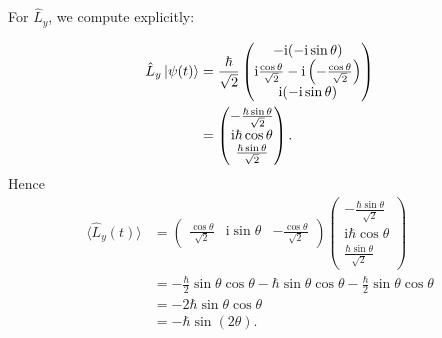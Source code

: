 \documentclass[11pt,a4paper]{scrartcl}
\newcommand{\ii}{\mathrm{i}}
\newcommand{\op}[1]{\hat{#1}}
\begin{document}
\begin{enumerate}[label=(\alph*)]
\begin{calculationbox}
            For $\op{L}_y$, we compute explicitly:
            \begin{calculationbox}
                \begin{align*}
                    \op{L}_y\ket{\psi(t)}
                    &=\frac{\hbar}{\sqrt{2}}
                    \begin{pmatrix}
                        -\ii(-\ii\sin\theta)\\
                        \ii\frac{\cos\theta}{\sqrt{2}}-\ii\left(-\frac{\cos\theta}{\sqrt{2}}\right)\\
                        \ii(-\ii\sin\theta)
                    \end{pmatrix} \\
                    &=
                    \begin{pmatrix}
                        -\frac{\hbar\sin\theta}{\sqrt{2}}\\
                        \ii\hbar\cos\theta\\
                        \frac{\hbar\sin\theta}{\sqrt{2}}
                    \end{pmatrix}.
                \end{align*}
                Hence
                \begin{align*}
                    \langle\op{L}_y(t)\rangle
                    &=
                    \begin{pmatrix}
                        \frac{\cos\theta}{\sqrt{2}} & \ii\sin\theta & -\frac{\cos\theta}{\sqrt{2}}
                    \end{pmatrix}
                    \begin{pmatrix}
                        -\frac{\hbar\sin\theta}{\sqrt{2}}\\
                        \ii\hbar\cos\theta\\
                        \frac{\hbar\sin\theta}{\sqrt{2}}
                    \end{pmatrix} \\
                    &= -\frac{\hbar}{2}\sin\theta\cos\theta
                    -\hbar\sin\theta\cos\theta
                    -\frac{\hbar}{2}\sin\theta\cos\theta \\
                    &= -2\hbar\sin\theta\cos\theta \\
                    &= -\hbar\sin(2\theta).
                \end{align*}
            \end{calculationbox}
        \end{calculationbox}


\end{enumerate}
\end{document}
